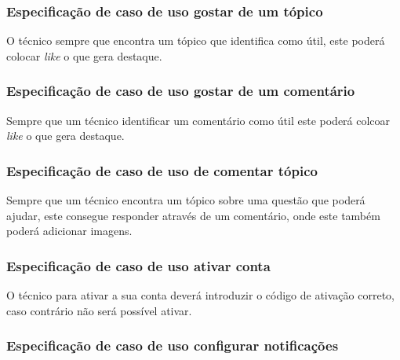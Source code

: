 

\newpage

\subsubsection{Especificação de caso de uso gostar de um tópico}

O técnico sempre que encontra um tópico que identifica como útil, este poderá colocar \textit{like} o que gera destaque.




\subsubsection{Especificação de caso de uso gostar de um comentário}

Sempre que um técnico identificar um comentário como útil este poderá colcoar \textit{like} o que gera destaque.



\newpage

\subsubsection{Especificação de caso de uso de comentar tópico}

Sempre que um técnico encontra um tópico sobre uma questão que poderá ajudar, este consegue responder através de um comentário, onde este também poderá adicionar imagens.



\newpage

\subsubsection{Especificação de caso de uso ativar conta}

O técnico para ativar a sua conta deverá introduzir o código de ativação correto, caso contrário não será possível ativar.



\newpage

\subsubsection{Especificação de caso de uso configurar notificações}

